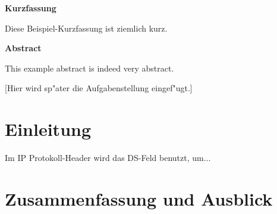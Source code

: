 \documentclass[11pt,twoside]{scrbook}
\begin{document}
\centerline{\bf Kurzfassung}

Diese Beispiel-Kurzfassung ist ziemlich kurz.

%
\vskip 3cm
%

\centerline{\bf Abstract}

This example abstract is indeed very abstract.

\cleardoublepage

\vspace*{7cm}
\centerline{[Hier wird sp"ater die Aufgabenstellung eingef"ugt.]}




\tableofcontents		%
\cleardoublepage
\listoffigures			%
\cleardoublepage
\listoftables			%
\cleardoublepage



\setcounter{page}{0}

\pagestyle{headings}

\chapter{Einleitung}

Im IP Protokoll-Header wird das DS-Feld \cite{RFC2474} benutzt, um...

\cleardoublepage



\chapter{Zusammenfassung und Ausblick}
\cleardoublepage




\begin{appendix}


\end{appendix}
\end{document}
